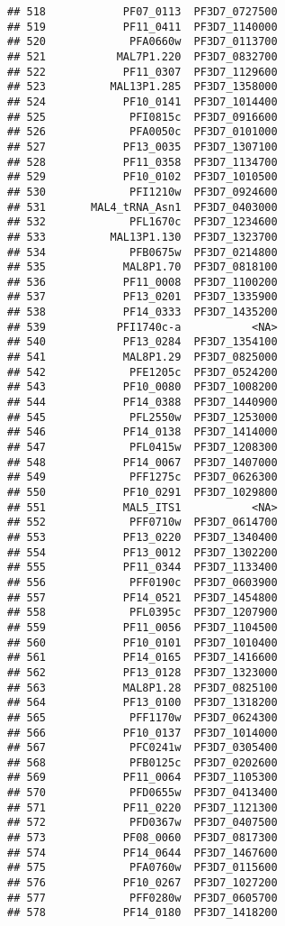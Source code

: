 \documentclass[12pt, a4paper]{article}\usepackage[]{graphicx}\usepackage[]{color}
\makeatletter
\newenvironment{kframe}{%
 \def\at@end@of@kframe{}%
 \ifinner\ifhmode%
  \def\at@end@of@kframe{\end{minipage}}%
  \begin{minipage}{\columnwidth}%
 \fi\fi%
 \def\FrameCommand##1{\hskip\@totalleftmargin \hskip-\fboxsep
 \colorbox{shadecolor}{##1}\hskip-\fboxsep
     \hskip-\linewidth \hskip-\@totalleftmargin \hskip\columnwidth}%
 \MakeFramed {\advance\hsize-\width
   \@totalleftmargin\z@ \linewidth\hsize
   \@setminipage}}%
 {\par\unskip\endMakeFramed%
 \at@end@of@kframe}
\newenvironment{knitrout}{}{} %
\makeatother
\begin{document}
\begin{knitrout}
\begin{kframe}
\begin{verbatim}
## 518            PF07_0113  PF3D7_0727500
## 519            PF11_0411  PF3D7_1140000
## 520             PFA0660w  PF3D7_0113700
## 521           MAL7P1.220  PF3D7_0832700
## 522            PF11_0307  PF3D7_1129600
## 523          MAL13P1.285  PF3D7_1358000
## 524            PF10_0141  PF3D7_1014400
## 525             PFI0815c  PF3D7_0916600
## 526             PFA0050c  PF3D7_0101000
## 527            PF13_0035  PF3D7_1307100
## 528            PF11_0358  PF3D7_1134700
## 529            PF10_0102  PF3D7_1010500
## 530             PFI1210w  PF3D7_0924600
## 531       MAL4_tRNA_Asn1  PF3D7_0403000
## 532             PFL1670c  PF3D7_1234600
## 533          MAL13P1.130  PF3D7_1323700
## 534             PFB0675w  PF3D7_0214800
## 535            MAL8P1.70  PF3D7_0818100
## 536            PF11_0008  PF3D7_1100200
## 537            PF13_0201  PF3D7_1335900
## 538            PF14_0333  PF3D7_1435200
## 539           PFI1740c-a           <NA>
## 540            PF13_0284  PF3D7_1354100
## 541            MAL8P1.29  PF3D7_0825000
## 542             PFE1205c  PF3D7_0524200
## 543            PF10_0080  PF3D7_1008200
## 544            PF14_0388  PF3D7_1440900
## 545             PFL2550w  PF3D7_1253000
## 546            PF14_0138  PF3D7_1414000
## 547             PFL0415w  PF3D7_1208300
## 548            PF14_0067  PF3D7_1407000
## 549             PFF1275c  PF3D7_0626300
## 550            PF10_0291  PF3D7_1029800
## 551            MAL5_ITS1           <NA>
## 552             PFF0710w  PF3D7_0614700
## 553            PF13_0220  PF3D7_1340400
## 554            PF13_0012  PF3D7_1302200
## 555            PF11_0344  PF3D7_1133400
## 556             PFF0190c  PF3D7_0603900
## 557            PF14_0521  PF3D7_1454800
## 558             PFL0395c  PF3D7_1207900
## 559            PF11_0056  PF3D7_1104500
## 560            PF10_0101  PF3D7_1010400
## 561            PF14_0165  PF3D7_1416600
## 562            PF13_0128  PF3D7_1323000
## 563            MAL8P1.28  PF3D7_0825100
## 564            PF13_0100  PF3D7_1318200
## 565             PFF1170w  PF3D7_0624300
## 566            PF10_0137  PF3D7_1014000
## 567             PFC0241w  PF3D7_0305400
## 568             PFB0125c  PF3D7_0202600
## 569            PF11_0064  PF3D7_1105300
## 570             PFD0655w  PF3D7_0413400
## 571            PF11_0220  PF3D7_1121300
## 572             PFD0367w  PF3D7_0407500
## 573            PF08_0060  PF3D7_0817300
## 574            PF14_0644  PF3D7_1467600
## 575             PFA0760w  PF3D7_0115600
## 576            PF10_0267  PF3D7_1027200
## 577             PFF0280w  PF3D7_0605700
## 578            PF14_0180  PF3D7_1418200

\end{verbatim}
\end{kframe}
\end{knitrout}
\end{document}
